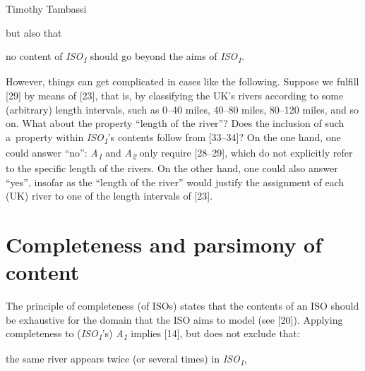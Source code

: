 \begin{artengenv}{Timothy Tambassi}
\begin{enumerate}[label={[\arabic*]}]
\end{enumerate}

but also that



\setcounter{saveenumtambassi}{\value{enumi}}

\begin{enumerate}[label={[\arabic*]}]

\setcounter{enumi}{\value{saveenumtambassi}}

\item no content of \textit{ISO}\textit{\textsubscript{1}} should go beyond the aims of \textit{ISO}\textit{\textsubscript{1}}.

\end{enumerate}

However, things can get complicated in cases like the following. Suppose we fulfill [29] by means of [23], that is, by classifying the UK's rivers according to some (arbitrary) length intervals, such as 0–40 miles, 40–80 miles, 80–120 miles, and so on. What about the property ``length of the river''? Does the inclusion of such a~property within \textit{ISO}\textit{\textsubscript{1}}'s contents follow from [33–34]? On the one hand, one could answer ``no'': \textit{A}\textit{\textsubscript{1}} and \textit{A}\textit{\textsubscript{2}} only require [28–29], which do not explicitly refer to the specific length of the rivers. On the other hand, one could also answer ``yes'', insofar as the ``length of the river'' would justify the assignment of each (UK) river to one of the length intervals of [23].



\section{Completeness and parsimony of content}

The principle of completeness (of ISOs) states that the contents of an ISO should be exhaustive for the domain that the ISO aims to model (see [20]). Applying completeness to (\textit{ISO}\textit{\textsubscript{1}}'s) \textit{A}\textit{\textsubscript{1}} implies [14], but does not exclude that:



\setcounter{saveenumtambassi}{\value{enumi}}

\begin{enumerate}[label={[\arabic*]}]

\setcounter{enumi}{\value{saveenumtambassi}}

\item the same river appears twice (or several times) in \textit{ISO}\textit{\textsubscript{1}},


\end{enumerate}
\end{artengenv}
